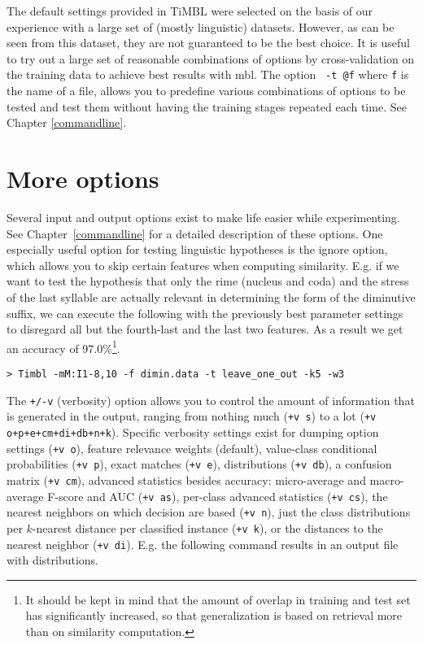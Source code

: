 \documentclass{report}
\begin{document}
The default settings provided in TiMBL were selected on the basis of
our experience with a large set of (mostly linguistic)
datasets. However, as can be seen from this dataset, they are not
guaranteed to be the best choice. It is useful to try out a large set
of reasonable combinations of options by cross-validation on the
training data to achieve best results with {\sc mbl}. The option {\tt
  -t @f} where {\tt f} is the name of a file, allows you to predefine
various combinations of options to be tested and test them without
having the training stages repeated each time. See Chapter
\ref{commandline}. 

\section{More options}

Several input and output options exist to make life easier while
experimenting. See Chapter~\ref{commandline} for a detailed
description of these options. One especially useful option for testing
linguistic hypotheses is the ignore option, which allows you to skip
certain features when computing similarity. E.g. if we want to test
the hypothesis that only the rime (nucleus and coda) and the stress of
the last syllable are actually relevant in determining the form of the
diminutive suffix, we can execute the following with the previously
best parameter settings to disregard all but the fourth-last and the
last two features. As a result we get an accuracy of
97.0\%\footnote{It should be kept in mind that the amount of overlap
in training and test set has significantly increased, so that
generalization is based on retrieval more than on similarity
computation.}. 

{\footnotesize
\begin{verbatim}
> Timbl -mM:I1-8,10 -f dimin.data -t leave_one_out -k5 -w3
\end{verbatim}
}

The {\tt +/-v} (verbosity) option allows you to control the amount of
information that is generated in the output, ranging from nothing much
({\tt +v s}) to a lot ({\tt +v o+p+e+cm+di+db+n+k}). Specific
verbosity settings exist for dumping option settings ({\tt +v o}),
feature relevance weights (default), value-class conditional
probabilities ({\tt +v p}), exact matches ({\tt +v e}), distributions
({\tt +v db}), a confusion matrix ({\tt +v cm}), advanced statistics
besides accuracy: micro-average and macro-average F-score and AUC
({\tt +v as}), per-class advanced statistics ({\tt +v cs}), the
nearest neighbors on which decision are based ({\tt +v n}), just the
class distributions per $k$-nearest distance per classified instance
({\tt +v k}), or the distances to the nearest neighbor ({\tt +v
  di}). E.g. the following command results in an output file with
distributions.
\end{document}
